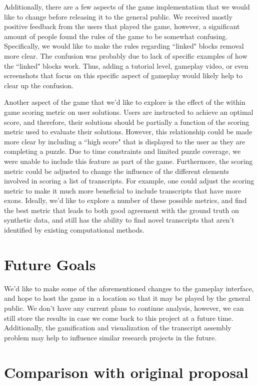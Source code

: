 \documentclass[12pt]{article}
\begin{document}
Additionally, there are a few aspects of the game implementation that we would like to change before releasing it to the general public. We received mostly
positive feedback from the users that played the game, however, a significant amount of people found the rules of the game to be somewhat confusing. Specifically,
we would like to make the rules regarding ``linked" blocks removal more clear. The confusion was probably due to lack of specific examples of how the ``linked" blocks
work. Thus, adding a tutorial level, gameplay video, or even screenshots that focus on this specific aspect of gameplay would likely help to clear up the confusion.

Another aspect of the game that we'd like to explore is the effect of the within game scoring metric on user solutions. Users are instructed to achieve an optimal score,
and therefore, their solutions should be partially a function of the scoring metric used to evaluate their solutions. However, this relationship could be made more clear by
including a ``high score" that is displayed to the user as they are completing a puzzle. Due to time constraints and limited puzzle coverage, we were unable to include this
feature as part of the game. Furthermore, the scoring metric could be adjusted to change the influence of the different elements involved in scoring a list of transcripts. For example,
one could adjust the scoring metric to make it much more beneficial to include transcripts that have more exons. Ideally, we'd like to explore a number of these possible
metrics, and find the best metric that leads to both good agreement with the ground truth on synthetic data, and still has the ability to find novel transcripts that aren't 
identified by existing computational methods.

\section*{Future Goals}

We'd like to make some of the aforementioned changes to the gameplay interface, and hope to host the game in a location so that it may be played by the general public.
We don't have any current plans to continue analysis, however, we can still store the results in case we come back to this project at a future time. Additionally, the gamification and
visualization of the transcript assembly problem may help to influence similar research projects in the future.

\section*{Comparison with original proposal}
\end{document}
